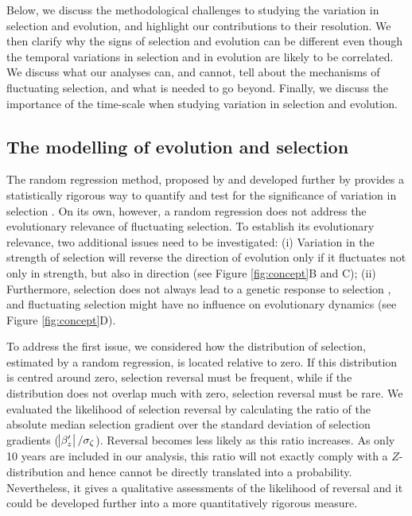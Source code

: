 Below, we discuss the methodological challenges to studying the variation in selection and evolution, and highlight our contributions to their resolution. We then clarify why the signs of selection and evolution can be different even though the temporal variations in selection and in evolution are likely to be correlated. We discuss what our analyses can, and cannot, tell about the mechanisms of fluctuating selection, and what is needed to go beyond. 
Finally, we discuss the importance of the time-scale when studying variation in selection and evolution.

\subsection*{The modelling of evolution and selection}
The random regression method, proposed by \cite{Morrissey2012flusel} and developed further by \cite{Chevin2015b} provides a statistically rigorous way to quantify and test for the significance of variation in selection \parencite{Chevin2015b}. On its own, however, a random regression does not address the evolutionary relevance of fluctuating selection. To establish its evolutionary relevance, two additional issues need to be investigated: (i) Variation in the strength of selection will reverse the direction of evolution only if it fluctuates not only in strength, but also in direction (see Figure \ref{fig:concept}B and C); (ii) Furthermore, selection does not always lead to a genetic response to selection \parencite{Rausher1992, Morrissey2010, Merila2001}, and fluctuating selection might have no influence on evolutionary dynamics (see Figure \ref{fig:concept}D).

To address the first issue, we considered how the distribution of selection, estimated by a random regression, is located relative to zero. If this distribution is centred around zero, selection reversal must be frequent, while if the distribution does not overlap much with zero, selection reversal must be rare.
We evaluated the likelihood of selection reversal by calculating the ratio of the absolute median selection gradient over the standard deviation of selection gradients ($\abs{\beta_{z}^\prime}/\sigma_\zeta$). Reversal becomes less likely as this ratio increases.
As only 10 years are included in our analysis, this ratio will not exactly comply with a $Z$-distribution and hence cannot be directly translated into a probability. Nevertheless, it gives a qualitative assessments of the likelihood of reversal and it could be developed further into a more quantitatively rigorous measure.

